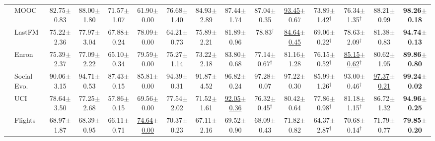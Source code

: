 \begin{table}[t]
{\begin{tabular}{llccccccccccccc}
 & MOOC & 82.75{\scriptsize$\pm$0.83} & 88.00{\scriptsize$\pm$1.80} & 71.57{\scriptsize$\pm$1.07} & 61.90{\scriptsize$\pm$0.00} & 76.68{\scriptsize$\pm$1.40} & 84.93{\scriptsize$\pm$2.89} & 87.44{\scriptsize$\pm$1.74} & 87.04{\scriptsize$\pm$0.35} & \underline{93.45{\scriptsize$\pm$0.67}} & 73.89{\scriptsize$\pm$1.42}$^\dagger$ & 76.34{\scriptsize$\pm$1.35}$^\dagger$ & 88.21{\scriptsize$\pm$0.99} & \textbf{98.26{\scriptsize$\pm$0.18}} \\
 & LastFM & 75.22{\scriptsize$\pm$2.36} & 77.97{\scriptsize$\pm$3.04} & 67.88{\scriptsize$\pm$0.24} & 78.09{\scriptsize$\pm$0.00} & 64.21{\scriptsize$\pm$0.73} & 75.89{\scriptsize$\pm$2.21} & 81.89{\scriptsize$\pm$0.96} & 78.83$^\dagger$ & \underline{84.64{\scriptsize$\pm$0.45}} & 69.06{\scriptsize$\pm$0.22}$^\dagger$ & 78.63{\scriptsize$\pm$2.09}$^\dagger$ & 81.38{\scriptsize$\pm$0.83} & \textbf{94.74{\scriptsize$\pm$0.13}} \\
 & Enron & 75.39{\scriptsize$\pm$2.37} & 77.09{\scriptsize$\pm$2.22} & 65.10{\scriptsize$\pm$0.34} & 79.59{\scriptsize$\pm$0.00} & 75.27{\scriptsize$\pm$1.14} & 73.22{\scriptsize$\pm$2.18} & 83.80{\scriptsize$\pm$0.68} & 77.14{\scriptsize$\pm$0.67}$^\dagger$ & 81.16{\scriptsize$\pm$1.28} & 76.15{\scriptsize$\pm$0.52}$^\dagger$ & \underline{85.15{\scriptsize$\pm$0.62}}$^\dagger$ & 80.62{\scriptsize$\pm$1.95} & \textbf{89.86{\scriptsize$\pm$0.80}} \\
 & Social Evo. & 90.06{\scriptsize$\pm$3.15} & 94.71{\scriptsize$\pm$0.53} & 87.43{\scriptsize$\pm$0.15} & 85.81{\scriptsize$\pm$0.00} & 94.39{\scriptsize$\pm$0.31} & 91.87{\scriptsize$\pm$4.52} & 96.82{\scriptsize$\pm$0.24} & 97.28{\scriptsize$\pm$0.07} & 97.22{\scriptsize$\pm$0.30} & 85.99{\scriptsize$\pm$1.26}$^\dagger$ & 93.00{\scriptsize$\pm$0.46}$^\dagger$ & \underline{97.37{\scriptsize$\pm$0.21}} & \textbf{99.24{\scriptsize$\pm$0.02}} \\
 & UCI & 78.64{\scriptsize$\pm$3.50} & 77.25{\scriptsize$\pm$2.68} & 57.86{\scriptsize$\pm$0.15} & 69.56{\scriptsize$\pm$0.00} & 77.54{\scriptsize$\pm$2.02} & 71.52{\scriptsize$\pm$1.61} & \underline{92.05{\scriptsize$\pm$0.36}} & 76.32{\scriptsize$\pm$0.45}$^\dagger$ & 80.42{\scriptsize$\pm$0.64} & 77.86{\scriptsize$\pm$0.98}$^\dagger$ & 81.18{\scriptsize$\pm$1.15}$^\dagger$ & 86.72{\scriptsize$\pm$1.32} & \textbf{94.96{\scriptsize$\pm$0.25}} \\
 & Flights & 68.97{\scriptsize$\pm$1.87} & 68.39{\scriptsize$\pm$0.95} & 66.11{\scriptsize$\pm$0.71} & \underline{74.64{\scriptsize$\pm$0.00}} & 70.37{\scriptsize$\pm$0.23} & 67.11{\scriptsize$\pm$2.16} & 69.52{\scriptsize$\pm$0.90} & 68.09{\scriptsize$\pm$0.43} & 71.82{\scriptsize$\pm$0.82} & 64.37{\scriptsize$\pm$2.87}$^\dagger$ & 70.68{\scriptsize$\pm$0.14}$^\dagger$ & 71.79{\scriptsize$\pm$0.77} & \textbf{79.85{\scriptsize$\pm$0.20}} \\

\end{tabular}}
\end{table}
